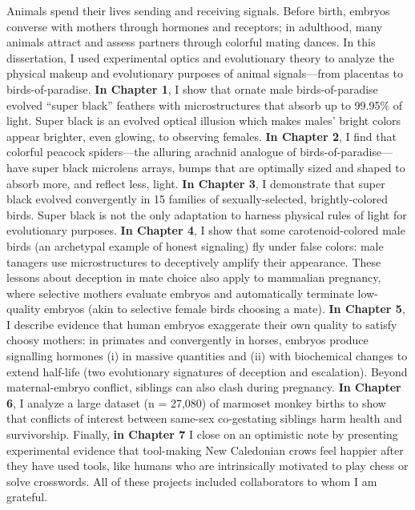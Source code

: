 
Animals spend their lives sending and receiving signals. Before birth, embryos converse with mothers through hormones and receptors; in adulthood, many animals attract and assess partners through colorful mating dances. In this dissertation, I used experimental optics and evolutionary theory to analyze the physical makeup and evolutionary purposes of animal signals—from placentas to birds-of-paradise. \textcolor{SchoolColor}{\textbf{In Chapter 1}}, I show that ornate male birds-of-paradise evolved “super black” feathers with microstructures that absorb up to 99.95\% of light. Super black is an evolved optical illusion which makes males’ bright colors appear brighter, even glowing, to observing females. \textcolor{SchoolColor}{\textbf{In Chapter 2}}, I find that colorful peacock spiders—the alluring arachnid analogue of birds-of-paradise—have super black microlens arrays, bumps that are optimally sized and shaped to absorb more, and reflect less, light. \textcolor{SchoolColor}{\textbf{In Chapter 3}}, I demonstrate that super black evolved convergently in 15 families of sexually-selected, brightly-colored birds. Super black is not the only adaptation to harness physical rules of light for evolutionary purposes. \textcolor{SchoolColor}{\textbf{In Chapter 4}}, I show that some carotenoid-colored male birds (an archetypal example of honest signaling) fly under false colors: male tanagers use microstructures to deceptively amplify their appearance. These lessons about deception in mate choice also apply to mammalian pregnancy, where selective mothers evaluate embryos and automatically terminate low-quality embryos (akin to selective female birds choosing a mate). \textcolor{SchoolColor}{\textbf{In Chapter 5}}, I describe evidence that human embryos exaggerate their own quality to satisfy choosy mothers: in primates and convergently in horses, embryos produce signalling hormones (i) in massive quantities and (ii) with biochemical changes to extend half-life (two evolutionary signatures of deception and escalation). Beyond maternal-embryo conflict, siblings can also clash during pregnancy. \textcolor{SchoolColor}{\textbf{In Chapter 6}}, I  analyze a large dataset (n = 27,080) of marmoset monkey births to show that conflicts of interest between same-sex co-gestating siblings harm health and survivorship. Finally, \textcolor{SchoolColor}{\textbf{in Chapter 7}} I close on an optimistic note by presenting experimental evidence that tool-making New Caledonian crows feel happier after they have used tools, like humans who are intrinsically motivated to play chess or solve crosswords. All of these projects included collaborators to whom I am grateful. 